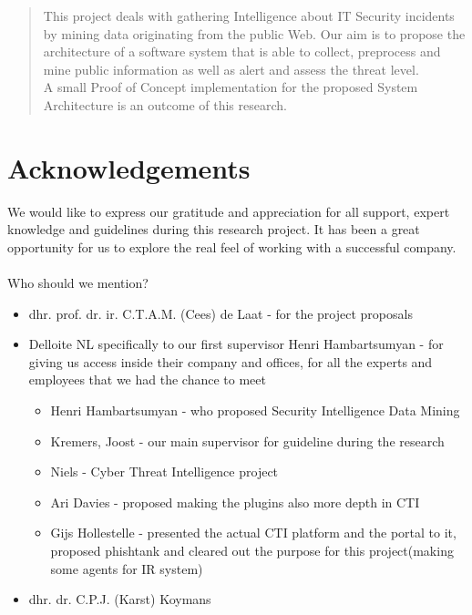 \documentclass[12pt]{article}
\begin{document}
\newpage
\begin{abstract}
\noindent
This project deals with gathering Intelligence about IT Security incidents by mining data originating from the public Web. Our aim is to propose the architecture of a software system that is able to collect, preprocess and mine public information as well as alert and assess the threat level. \\
A small Proof of Concept implementation for the proposed System Architecture is an outcome of this research. 
\end{abstract}
\newpage
\section*{Acknowledgements}

We would like to express our gratitude and appreciation for all support, expert knowledge and guidelines during this research project. It has been a great opportunity for us to explore the real feel of working with a successful company. 
\\
\\
Who should we mention? 
\begin{itemize}
\item{dhr. prof. dr. ir. C.T.A.M. (Cees) de Laat - for the project proposals}
\item{Delloite NL specifically to our first supervisor Henri Hambartsumyan - for giving us access inside their company and offices, for all the experts and employees that we had the chance to meet}
 \begin{itemize}
 \item{Henri Hambartsumyan - who proposed Security Intelligence Data Mining}
 \item{Kremers, Joost  - our main supervisor for guideline during the research }
 \item{Niels - Cyber Threat Intelligence project}
 \item{Ari Davies - proposed making the plugins also more depth in CTI }
 \item{Gijs Hollestelle - presented the actual CTI platform and the portal to it, proposed phishtank and cleared out the purpose for this project(making some agents for IR system) }
 \end{itemize}
\item{dhr. dr. C.P.J. (Karst) Koymans}
\end{itemize}
\newpage

\tableofcontents
\newpage
\end{document}
